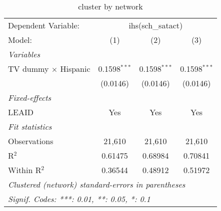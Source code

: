 \begin{table}[htbp]
\centering
\caption{cluster by network}
\begin{tabular}{lccc}
\tabularnewline\midrule\midrule
Dependent Variable:&\multicolumn{3}{c}{ihs(sch\_satact)}\\
Model:&(1) & (2) & (3)\\
\midrule \emph{Variables}&   &   &  \\
TV dummy $\times$ Hispanic & 0.1598$^{***}$ & 0.1598$^{***}$ & 0.1598$^{***}$\\
  &(0.0146) & (0.0146) & (0.0146)\\
\midrule \emph{Fixed-effects}&   &   &  \\
LEAID & Yes & Yes & Yes\\
\midrule \emph{Fit statistics}&  & & \\
Observations & 21,610&21,610&21,610\\
R$^2$ & 0.61475&0.68984&0.70841\\
Within R$^2$ & 0.36544&0.48912&0.51972\\
\midrule\midrule\multicolumn{4}{l}{\emph{Clustered (network) standard-errors in parentheses}}\\
\multicolumn{4}{l}{\emph{Signif. Codes: ***: 0.01, **: 0.05, *: 0.1}}\\
\end{tabular}
\end{table}

